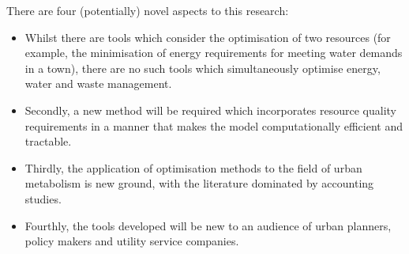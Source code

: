 There are four (potentially) novel aspects to this research: 
\begin{itemize}
	\item Whilst there are tools which consider the optimisation of two resources (for example, the minimisation of energy requirements for meeting water demands in a town), there are no such tools which simultaneously optimise energy, water and waste management. 
	\item Secondly, a new method will be required which incorporates resource quality requirements in a manner that makes the model computationally efficient and tractable. 
	\item Thirdly, the application of optimisation methods to the field of urban metabolism is new ground, with the literature dominated by accounting studies.
	\item Fourthly, the tools developed will be new to an audience of urban planners, policy makers and utility service companies.
\end{itemize}

